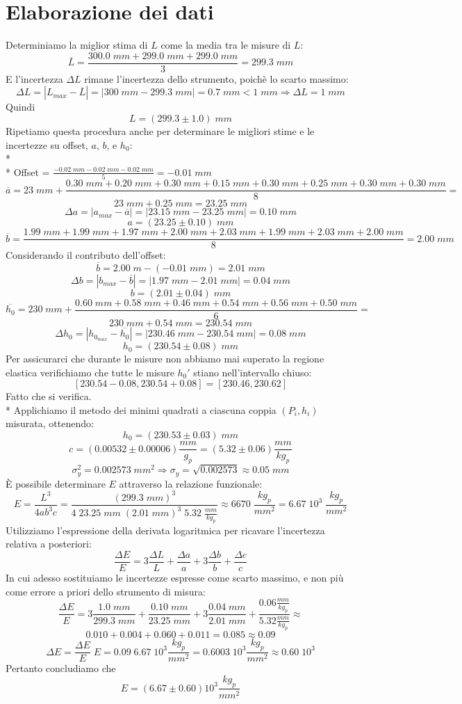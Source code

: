 \documentclass[10pt,a4paper]{book}
\begin{document}
\section*{Elaborazione dei dati}
Determiniamo la miglior stima di $L$ come la media tra le misure di $L$:
$$
\overline{L} = \frac{300.0\;mm+299.0\;mm+299.0\;mm}{3} = 299.3\;mm
$$
E l'incertezza $\Delta L$ rimane l'incertezza dello strumento, poichè lo scarto massimo:
$$
\Delta L = |{L_{max}-\overline{L}}| = |{300\;mm - 299.3\;mm}| = 0.7\;mm < 1\;mm \Rightarrow \Delta L = 1\;mm
$$
Quindi
$$
L = (299.3 \pm 1.0)\;mm
$$
Ripetiamo questa procedura anche per determinare le migliori stime e le incertezze su offset, $a$, $b$, e $h_0$:\\*\\*
Offset = $\frac{-0.02\;mm - 0.02\;mm - 0.02\;mm}{5} = -0.01\;mm$
$$
\overline{a} = 23\;mm + \frac{0.30\;mm + 0.20\;mm + 0.30\;mm + 0.15\;mm + 0.30\;mm + 0.25\;mm + 0.30\;mm + 0.30\;mm}{8} = $$
$$23\;mm + 0.25\;mm = 23.25\;mm
$$
$$
\Delta a = |a_{max} - \overline{a}| = |23.15\;mm - 23.25\;mm| = 0.10\;mm
$$
$$
a = (23.25 \pm 0.10)\;mm
$$
$$
\overline{b} = \frac{1.99\;mm + 1.99\;mm + 1.97\;mm + 2.00\;mm + 2.03\;mm+1.99\;mm+2.03\;mm+2.00\;mm}{8} = 2.00\;mm
$$
Considerando il contributo dell'offset:
$$
\overline{b} = 2.00\;m - (-0.01\;mm) = 2.01\;mm
$$
$$
\Delta b = |b_{max} - \overline{b}| = |1.97\;mm - 2.01\;mm| = 0.04\;mm
$$
$$
b = (2.01 \pm 0.04)\;mm
$$
$$
\overline{h_0} = 230\;mm + \frac{0.60\;mm + 0.58\;mm+0.46\;mm+0.54\;mm+0.56\;mm+0.50\;mm}{6} =
$$
$$ 230\;mm + 0.54\;mm = 230.54\;mm
$$
$$
\Delta h_0 = |h_{0_{max}} - \overline{h_0}| = |230.46\;mm - 230.54\;mm| = 0.08\;mm
$$
$$
h_0 = (230.54 \pm 0.08)\;mm
$$
Per assicurarci che durante le misure non abbiamo mai superato la regione elastica verifichiamo che tutte le misure $h_0'$ stiano nell'intervallo chiuso:
$$
[230.54 - 0.08,230.54 + 0.08] = [230.46, 230.62]
$$
Fatto che si verifica.\\*
Applichiamo il metodo dei minimi quadrati a ciascuna coppia $(P_i, h_i)$ misurata, ottenendo:
$$
h_0 = (230.53 \pm 0.03)\;mm
$$
$$
c = (0.00532 \pm 0.00006) \frac{mm}{g_p} = (5.32 \pm 0.06) \frac{mm}{kg_p}
$$
$$
\sigma^2_y = 0.002573\;mm^2 \Rightarrow \sigma_y = \sqrt{0.002573} \approx 0.05\;mm
$$
È possibile determinare $E$ attraverso la relazione funzionale:
$$
E = \frac{L^3}{4ab^3c} = \frac{(299.3\;mm)^3}{4\;23.25\;mm\;(2.01\;mm)^3\;5.32\;\frac{mm}{kg_p}} \approx 6670\;\frac{kg_p}{mm^2} = 6.67\;10^3 \;\frac{kg_p}{mm^2} 
$$
Utilizziamo l'espressione della derivata logaritmica per ricavare l'incertezza relativa a posteriori:
$$
\frac{\Delta E}{E} = 3\frac{\Delta L}{L} + \frac{\Delta a}{a} + 3 \frac{\Delta b}{b} + \frac{\Delta c}{c}
$$
In cui adesso sostituiamo le incertezze espresse come scarto massimo, e non più come errore a priori dello strumento di misura:
$$
\frac{\Delta E}{E} = 3\frac{1.0\;mm}{299.3\;mm} + \frac{0.10\;mm}{23.25\;mm} + 3 \frac{0.04\;mm}{2.01\;mm} + \frac{0.06 \frac{mm}{kg_p}}{5.32 \frac{mm}{kg_p}} \approx
$$
$$
0.010 + 0.004 + 0.060 + 0.011 = 0.085 \approx 0.09
$$
$$
\Delta E = \frac{\Delta E}{E}\;E = 0.09\;6.67\;10^3 \frac{kg_p}{mm^2} = 0.6003\;10^3 \frac{kg_p}{mm^2} \approx 0.60\;10^3
$$
Pertanto concludiamo che
$$
E = (6.67\pm0.60)10^3 \frac{kg_p}{mm^2}
$$
\end{document}

